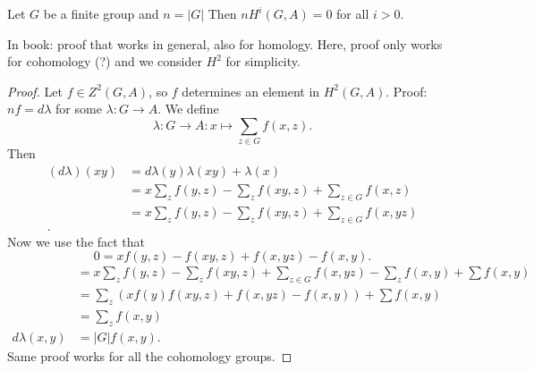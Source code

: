 \begin{theorem}[6.5.8]
    Let $G$ be a finite group and $n = |G|$ 
    Then $n H^{i}(G, A) = 0$ for all $i > 0$.
\end{theorem}
\begin{remark}
    In book: proof that works in general, also for homology.
    Here, proof only works for cohomology (?) and we consider $H^2$ for simplicity.
\end{remark}
\begin{proof}
    Let $f \in Z^2(G, A)$,  so $f$ determines an element in  $H^2(G, A)$.
    Proof: $nf = d \lambda $ for some  $\lambda: G \to  A$.
    We define
    \[
        \lambda: G \to  A: x \mapsto \sum_{z \in G} f(x, z)
    .\] 
    Then
    \begin{align*}
        (d\lambda)(xy) &= d \lambda(y) \lambda(xy) + \lambda(x)\\
                       &= x \sum_z f(y,z) - \sum_z f(xy,z) + \sum_{z \in G} f(x,z)\\
                    &= x \sum_z f(y,z) - \sum_z f(xy,z) + \sum_{z \in G} f(x,yz)\\
    .\end{align*}
    Now we use the fact  that 
    \[
        0 = x f(y,z) - f(xy,z) + f(x,yz) - f(x,y)
    .\] 
    \begin{align*}
        &= x \sum_z f(y,z) - \sum_z f(xy,z) + \sum_{z \in G} f(x,yz) - \sum_z f(x,y) + \sum f(x,y)\\
        &= \sum_z (xf(y) f(xy,z) + f(x,yz) - f(x,y)) + \sum f(x,y)\\
        &= \sum_z f(x,y)\\
        d\lambda(x,y)&= |G| f(x,y)
    .\end{align*}
    Same proof works for all the cohomology groups.
\end{proof}


